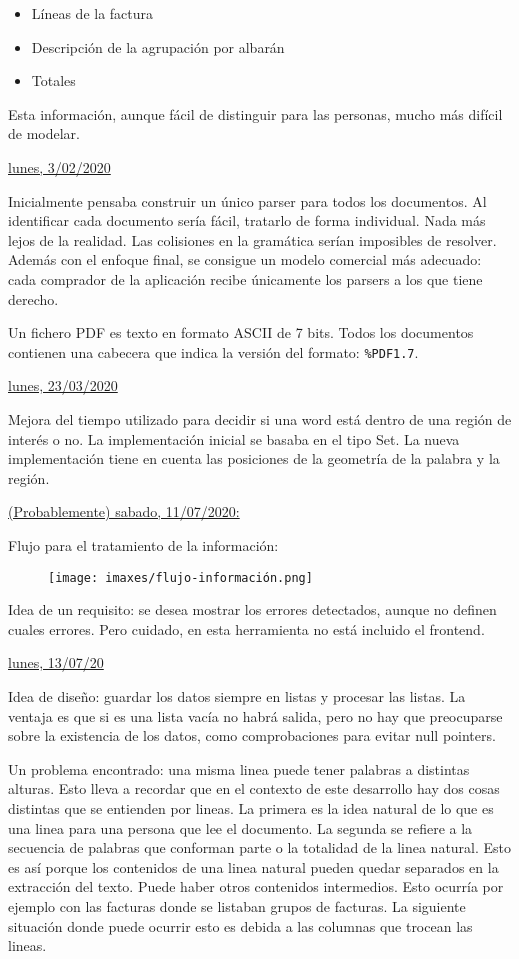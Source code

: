 \begin{itemize}
    \item Líneas de la factura
    \item Descripción de la agrupación por albarán
    \item Totales
\end{itemize}

Esta información, aunque fácil de distinguir para las personas, mucho más difícil de modelar.

\underline{lunes, 3/02/2020}

Inicialmente pensaba construir un único parser para todos los documentos. Al identificar cada documento sería fácil, tratarlo de forma individual. Nada más lejos de la realidad. Las colisiones en la gramática serían imposibles de resolver. Además con el enfoque final, se consigue un modelo comercial más adecuado: cada comprador de la aplicación recibe únicamente los parsers a los que tiene derecho.

Un fichero PDF es texto en formato ASCII de 7 bits. Todos los documentos contienen una cabecera que indica la versión del formato: \verb|%PDF1.7|.

\underline{lunes, 23/03/2020}

Mejora del tiempo utilizado para decidir si una word está dentro de una región de interés o no. La implementación inicial se basaba en el tipo Set. La nueva implementación tiene en cuenta las posiciones de la geometría de la palabra y la región.

\underline{(Probablemente) sabado, 11/07/2020:}

Flujo para el tratamiento de la información:

\begin{figure}[hp!]
  \centering
  \texttt{[image: imaxes/flujo-información.png]}
\end{figure}

Idea de un requisito: se desea mostrar los errores detectados, aunque no definen cuales errores. Pero cuidado, en esta herramienta no está incluido el frontend.

\underline{lunes, 13/07/20}

Idea de diseño: guardar los datos siempre en listas y procesar las listas. La ventaja es que si es una lista vacía no habrá salida, pero no hay que preocuparse sobre la existencia de los datos, como comprobaciones para evitar null pointers.

Un problema encontrado: una misma linea puede tener palabras a distintas alturas. Esto lleva a recordar que en el contexto de este desarrollo hay dos cosas distintas que se entienden por lineas. La primera es la idea natural de lo que es una linea para una persona que lee el documento. La segunda se refiere a la secuencia de palabras que conforman parte o la totalidad de la linea natural. Esto es así porque los contenidos de una linea natural pueden quedar separados en la extracción del texto. Puede haber otros contenidos intermedios. Esto ocurría por ejemplo con las facturas donde se listaban grupos de facturas. La siguiente situación donde puede ocurrir esto es debida a las columnas que trocean las lineas.

